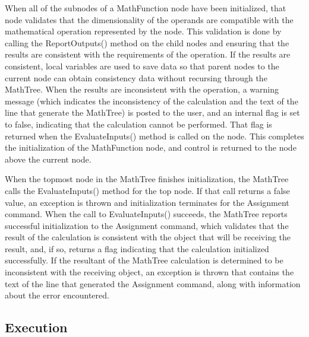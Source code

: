When all of the subnodes of a MathFunction node have been initialized, that
node validates that the dimensionality of the operands are compatible with the
mathematical operation represented by the node.  This validation is done by
calling the ReportOutputs() method on the child nodes and ensuring that the
results are consistent with the requirements of the operation.  If the results
are consistent, local variables are used to save data so that parent nodes to
the current node can obtain consistency data without recursing through the
MathTree.  When the results are inconsistent with the operation, a warning
message (which indicates the inconsistency of the calculation and the text of
the line that generate the MathTree) is posted to the user, and an internal
flag is set to false, indicating that the calculation cannot be performed.
That flag is returned when the EvaluateInputs() method is called on the node.
This completes the initialization of the MathFunction node, and control is
returned to the node above the current node.

When the topmost node in the MathTree finishes initialization, the MathTree
calls the EvaluateInputs() method for the top node.  If that call returns a
false value, an exception is thrown and initialization terminates for the
Assignment command.  When the call to EvaluateInputs() succeeds, the MathTree
reports successful initialization to the Assignment command, which validates
that the result of the calculation is consistent with the object that will be
receiving the result, and, if so, returns a flag indicating that the
calculation initialized successfully.  If the resultant of the MathTree
calculation is determined to be inconsistent with the receiving object, an
exception is thrown that contains the text of the line that generated the
Assignment command, along with information about the error encountered.

\subsection{Execution}


